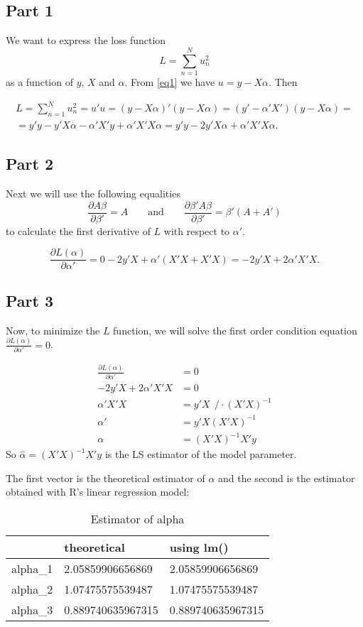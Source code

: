 \documentclass[12pt, a4paper]{article}\usepackage[]{graphicx}\usepackage[]{color}
\begin{document}
\subsection{Part 1}
We want to express the loss function 
\[ L = \sum_{n=1}^{N} u_n^2 \]
as a function of $y$, $X$ and $\alpha$. From \eqref{eq1} we have $u=y-X\alpha$. Then

\begin{gather*} 
L = \sum_{n=1}^{N} u_n^2 = u' u = (y-X\alpha)' (y-X\alpha) = (y'-\alpha' X')(y-X\alpha) = \\
= y'y - y'X\alpha - \alpha'X'y + \alpha'X'X\alpha = y'y - 2y'X\alpha + \alpha'X'X\alpha.
\end{gather*}


\subsection{Part 2}
Next we will use the following equalities
\[ \frac{\partial A\beta}{\partial \beta'} = A \qquad \text{and} \qquad  \frac{\partial \beta' A\beta}{\partial \beta'} = \beta'(A+A')\]
to calculate the first derivative of $L$ with respect to $\alpha'$.

\[ \frac{\partial L(\alpha)}{\partial \alpha'} = 0 - 2y'X + \alpha'(X'X + X'X) = - 2y'X +2 \alpha'X'X. \]


\subsection{Part 3} \label{referencja}
Now, to minimize the $L$ function, we will solve the first order condition equation $\frac{\partial L(\alpha)}{\partial \alpha'} = 0 $.

\begin{align*}
\frac{\partial L(\alpha)}{\partial \alpha'} & = 0 \\
-2 y'X + 2 \alpha'X'X  & = 0 \\
\alpha'X'X & = y'X \ \ /\cdot (X'X)^{-1} \\
\alpha' & = y'X (X'X)^{-1} \\
\alpha & = (X'X)^{-1} X'y
\end{align*}
So $\hat{\alpha}  = (X'X)^{-1} X'y$ is the LS estimator of the model parameter.

The first vector is the theoretical estimator of $\alpha$ and the second is the estimator obtained with R's linear regression model:
\begin{table}[H]
\centering
\begin{tabular}{lll}
  \hline
  & theoretical & using lm() \\ 
  \hline
alpha\_1 & 2.05859906656869 & 2.05859906656869 \\ 
  alpha\_2 & 1.07475575539487 & 1.07475575539487 \\ 
  alpha\_3 & 0.889740635967315 & 0.889740635967315 \\ 
   \hline
\end{tabular}
\caption{Estimator of alpha} 
\label{tab:alpha.est}
\end{table}
\end{document}
